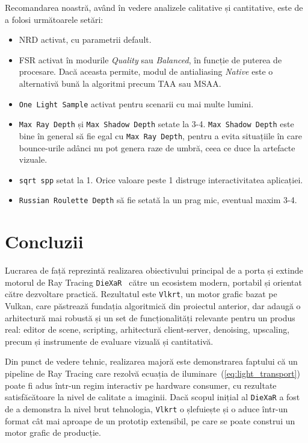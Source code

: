 \documentclass[12pt,a4paper]{report}
\numberwithin{equation}{section} %
\begin{document}
Recomandarea noastră, având în vedere analizele calitative și cantitative, este de a folosi următoarele setări:

\begin{itemize}
    \item NRD activat, cu parametrii default.
    \item FSR activat în modurile \textit{Quality} sau \textit{Balanced}, în funcție de puterea de procesare.
          Dacă aceasta permite, modul de antialiasing \textit{Native} este o alternativă bună la algoritmi precum TAA sau MSAA.
    \item \texttt{One Light Sample} activat pentru scenarii cu mai multe lumini.
    \item \texttt{Max Ray Depth} și \texttt{Max Shadow Depth} setate la 3-4.
          \texttt{Max Shadow Depth} este bine în general să fie egal cu \texttt{Max Ray Depth}, pentru a evita situațiile în care bounce-urile adânci nu pot genera raze de umbră, ceea ce duce la artefacte vizuale.
    \item \texttt{sqrt spp} setat la 1. Orice valoare peste 1 distruge interactivitatea aplicației.
    \item \texttt{Russian Roulette Depth} să fie setată la un prag mic, eventual maxim 3-4.
\end{itemize} 


\chapter{\label{sec:concluzii}Concluzii}

Lucrarea de față reprezintă realizarea obiectivului principal de a porta și extinde motorul de Ray Tracing \texttt{DieXaR}~\cite{DieXaR2024} către un ecosistem modern, portabil și orientat către dezvoltare practică.
Rezultatul este \texttt{Vlkrt}, un motor grafic bazat pe Vulkan, care păstrează fundația algoritmică din proiectul anterior, dar adaugă o arhitectură mai robustă și un set de funcționalități relevante pentru un produs real: editor de scene, scripting, arhitectură client-server, denoising, upscaling, precum și instrumente de evaluare vizuală și cantitativă.

Din punct de vedere tehnic, realizarea majoră este demonstrarea faptului că un pipeline de Ray Tracing care rezolvă ecuația de iluminare~(\ref{eq:light_transport}) poate fi adus într-un regim interactiv pe hardware consumer, cu rezultate satisfăcătoare la nivel de calitate a imaginii.
Dacă scopul inițial al \texttt{DieXaR} a fost de a demonstra la nivel brut tehnologia, \texttt{Vlkrt} o șlefuiește și o aduce într-un format cât mai aproape de un prototip extensibil, pe care se poate construi un motor grafic de producție.
\end{document}
